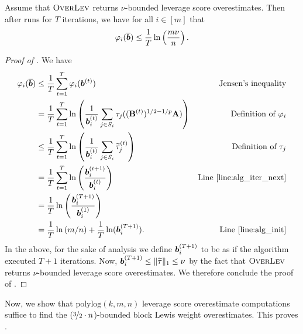 \documentclass[11pt]{article}
\numberwithin{equation}{section}
\begin{document}
\begin{lemma}\label{lemma:alg_analysis1}
    Assume that \(\textsc{OverLev}\) returns \(\nu\)-bounded leverage score overestimates.
   Then after  runs for \(T\) iterations, we have for all \(i \in [m]\) that
    \[\varphi_i(\overline{\bm{b}}) \le \frac{1}{T} \ln\left(\frac{m \nu}{n}\right).\]
\end{lemma}
\begin{proof}[Proof of ]
    We have
    \begin{align*}
        \varphi_i(\overline{\bm{b}}) &\le \frac{1}{T} \sum_{t=1}^T \varphi_i(\bm{b}^{(t)}) &\text{Jensen's inequality} \\
        &= \frac{1}{T} \sum_{t=1}^T \ln \left(\frac{1}{\bm{b}_i^{(t)}} \sum_{j \in S_i} \tau_j((\mathbf{B}^{(t)})^{1/2 - 1/p} \mathbf{A})\right) &\text{Definition of \(\varphi_i\)}\\
        &\le \frac{1}{T} \sum_{t=1}^T \ln \left(\frac{1}{\bm{b}_i^{(t)}} \sum_{j \in S_i} \widetilde{\tau}_j^{(t)}\right) &\text{Definition of \(\tau_j\)}\\
        &= \frac{1}{T} \sum_{t=1}^T \ln \left(\frac{\bm{b}_i^{(t+1)}}{\bm{b}_i^{(t)}}\right) &\text{Line \ref{line:alg_iter_next}} \\
        &= \frac{1}{T} \ln\left(\frac{\bm{b}_i^{(T+1)}}{\bm{b}_i^{(1)}}\right) \\
        &= \frac{1}{T} \ln\left(m/n\right) + \frac{1}{T} \ln(\bm{b}_i^{(T+1)}). &\text{Line \ref{line:alg_init}}
    \end{align*}
    In the above, for the sake of analysis we define \(\bm{b}_i^{(T+1)}\) to be as if the algorithm executed \(T+1\) iterations. Now, \(\bm{b}_i^{(T+1)} \le \|\widetilde{\tau}\|_1 \le \nu\) by the fact that \(\textsc{OverLev}\) returns \(\nu\)-bounded leverage score overestimates. We therefore conclude the proof of .
\end{proof}

Now, we show that \(\text{polylog}(k,m,n)\) leverage score overestimate computations suffice to find the \((\nicefrac{3}{2}\cdot n\))-bounded block Lewis weight overestimates. This proves .
\end{document}
